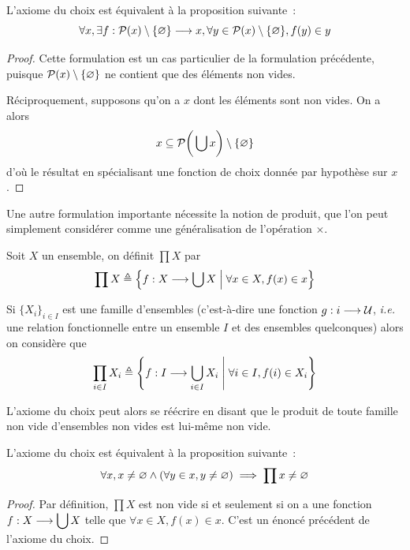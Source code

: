 \begin{proposition}
  L'axiome du choix est équivalent à la proposition suivante~:
  \[\forall x, %
  \exists \makeFunName{f}{\powerset(x) \setminus \{\vide\}}{x},
  \forall y \in \powerset(x)\setminus \{\vide\}, f(y)\in y\]
\end{proposition}

\begin{proof}
  Cette formulation est un cas particulier de la formulation précédente, puisque
  $\mathcal{P}(x)\setminus\{\varnothing\}$ ne contient que des éléments non vides.

  Réciproquement, supposons qu'on a $x$ dont les éléments sont non
  vides. On a alors
  \[x\subseteq \mathcal{P}\bigg(\bigcup x\bigg)\setminus\{\varnothing\}\]
  d'où le résultat en spécialisant une fonction de choix donnée par hypothèse
  sur $x$.
\end{proof}

Une autre formulation importante nécessite la notion de produit, que l'on peut
simplement considérer comme une généralisation de l'opération $\times$.

\begin{definition}
  Soit $X$ un ensemble, on définit $\prod X$ par
  \[\prod X \triangleq
  \left\{ f : \displaystyle X \longrightarrow \bigcup X \;\middle\vert\; \forall x \in X, f(x)\in x \right\}\]

  Si $\{X_i\}_{i\in I}$ est une famille d'ensembles (c'est-à-dire une fonction
  $g : \displaystyle i \longrightarrow \mathcal{U}$, \textit{i.e.} une relation fonctionnelle entre un
  ensemble $I$ et des ensembles quelconques) alors on considère que
  \[\prod_{i\in I} X_i \triangleq
  \left\{ f : \displaystyle I \longrightarrow \bigcup_{i\in I} X_i \;\middle\vert\; \forall i \in I, f(i) \in X_i \right\}\]
\end{definition}

L'axiome du choix peut alors se réécrire en disant que le produit de toute
famille non vide d'ensembles non vides est lui-même non vide.

\begin{proposition}
  L'axiome du choix est équivalent à la proposition suivante~:
  \[\forall x, x\neq \varnothing \land (\forall y \in x, y \neq \varnothing)
  \implies \prod x \neq \varnothing\]
\end{proposition}

\begin{proof}
  Par définition, $\prod X$ est non vide si et seulement si on a une fonction
  $f : \displaystyle X \longrightarrow \bigcup X$ telle que $\forall x \in X, f(x)\in x$. C'est
  un énoncé précédent de l'axiome du choix.
\end{proof}

